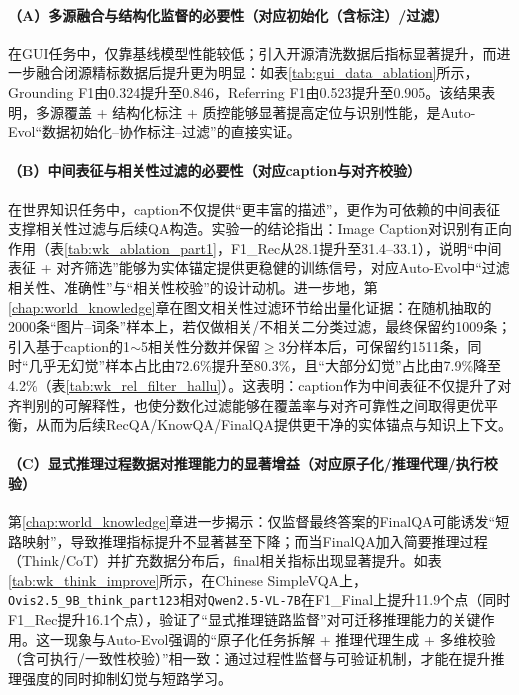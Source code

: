 \paragraph{（A）多源融合与结构化监督的必要性（对应初始化（含标注）/过滤）}
在GUI任务中，仅靠基线模型性能较低；引入开源清洗数据后指标显著提升，而进一步融合闭源精标数据后提升更为明显：如表\ref{tab:gui_data_ablation}所示，Grounding F1由0.324提升至0.846，Referring F1由0.523提升至0.905。该结果表明，多源覆盖 + 结构化标注 + 质控能够显著提高定位与识别性能，是Auto-Evol“数据初始化--协作标注--过滤”的直接实证。

\paragraph{（B）中间表征与相关性过滤的必要性（对应caption与对齐校验）}
在世界知识任务中，caption不仅提供“更丰富的描述”，更作为可依赖的中间表征支撑相关性过滤与后续QA构造。实验一的结论指出：Image Caption对识别有正向作用（表\ref{tab:wk_ablation_part1}，F1\_Rec从28.1提升至31.4--33.1），说明“中间表征 + 对齐筛选”能够为实体锚定提供更稳健的训练信号，对应Auto-Evol中“过滤相关性、准确性”与“相关性校验”的设计动机。进一步地，第\ref{chap:world_knowledge}章在图文相关性过滤环节给出量化证据：在随机抽取的2000条“图片--词条”样本上，若仅做相关/不相关二分类过滤，最终保留约1009条；引入基于caption的1$\sim$5相关性分数并保留$\ge$3分样本后，可保留约1511条，同时“几乎无幻觉”样本占比由72.6\%提升至80.3\%，且“大部分幻觉”占比由7.9\%降至4.2\%（表\ref{tab:wk_rel_filter_hallu}）。这表明：caption作为中间表征不仅提升了对齐判别的可解释性，也使分数化过滤能够在覆盖率与对齐可靠性之间取得更优平衡，从而为后续RecQA/\allowbreak KnowQA/\allowbreak FinalQA提供更干净的实体锚点与知识上下文。

\paragraph{（C）显式推理过程数据对推理能力的显著增益（对应原子化/推理代理/执行校验）}
第\ref{chap:world_knowledge}章进一步揭示：仅监督最终答案的FinalQA可能诱发“短路映射”，导致推理指标提升不显著甚至下降；而当FinalQA加入简要推理过程（Think/CoT）并扩充数据分布后，final相关指标出现显著提升。如表\ref{tab:wk_think_improve}所示，在Chinese SimpleVQA上，\texttt{Ovis2.5\_9B\_think\_part123}相对\texttt{Qwen2.5-VL-7B}在F1\_Final上提升11.9个点（同时F1\_Rec提升16.1个点），验证了“显式推理链路监督”对可迁移推理能力的关键作用。这一现象与Auto-Evol强调的“原子化任务拆解 + 推理代理生成 + 多维校验（含可执行/一致性校验）”相一致：通过过程性监督与可验证机制，才能在提升推理强度的同时抑制幻觉与短路学习。

